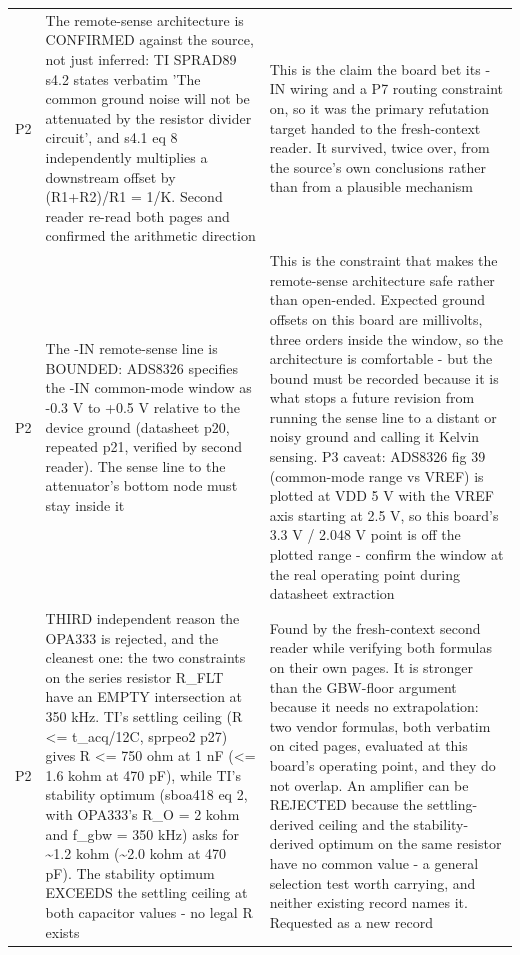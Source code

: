 \documentclass[11pt,a4paper]{article}
\begin{document}
{\begin{longtable}{lp{5.2cm}p{7.2cm}}
P2 & The remote-sense architecture is CONFIRMED against the source, not just inferred: TI SPRAD89 s4.2 states verbatim 'The common ground noise will not be attenuated by the resistor divider circuit', and s4.1 eq 8 independently multiplies a downstream offset by (R1+R2)/R1 = 1/K. Second reader re-read both pages and confirmed the arithmetic direction & This is the claim the board bet its -IN wiring and a P7 routing constraint on, so it was the primary refutation target handed to the fresh-context reader. It survived, twice over, from the source's own conclusions rather than from a plausible mechanism \\
P2 & The -IN remote-sense line is BOUNDED: ADS8326 specifies the -IN common-mode window as -0.3 V to +0.5 V relative to the device ground (datasheet p20, repeated p21, verified by second reader). The sense line to the attenuator's bottom node must stay inside it & This is the constraint that makes the remote-sense architecture safe rather than open-ended. Expected ground offsets on this board are millivolts, three orders inside the window, so the architecture is comfortable - but the bound must be recorded because it is what stops a future revision from running the sense line to a distant or noisy ground and calling it Kelvin sensing. P3 caveat: ADS8326 fig 39 (common-mode range vs VREF) is plotted at VDD 5 V with the VREF axis starting at 2.5 V, so this board's 3.3 V / 2.048 V point is off the plotted range - confirm the window at the real operating point during datasheet extraction \\
P2 & THIRD independent reason the OPA333 is rejected, and the cleanest one: the two constraints on the series resistor R\_FLT have an EMPTY intersection at 350 kHz. TI's settling ceiling (R \textless{}= t\_acq/12C, sprpeo2 p27) gives R \textless{}= 750 ohm at 1 nF (\textless{}= 1.6 kohm at 470 pF), while TI's stability optimum (sboa418 eq 2, with OPA333's R\_O = 2 kohm and f\_gbw = 350 kHz) asks for \textasciitilde{}1.2 kohm (\textasciitilde{}2.0 kohm at 470 pF). The stability optimum EXCEEDS the settling ceiling at both capacitor values - no legal R exists & Found by the fresh-context second reader while verifying both formulas on their own pages. It is stronger than the GBW-floor argument because it needs no extrapolation: two vendor formulas, both verbatim on cited pages, evaluated at this board's operating point, and they do not overlap. An amplifier can be REJECTED because the settling-derived ceiling and the stability-derived optimum on the same resistor have no common value - a general selection test worth carrying, and neither existing record names it. Requested as a new record \\

\end{longtable}}
\end{document}
